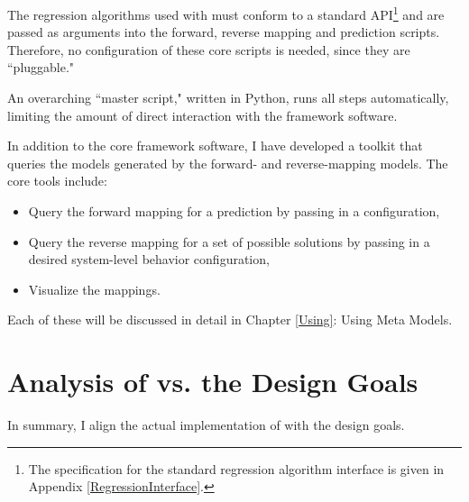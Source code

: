 The regression algorithms used with \fw must conform to a standard API\footnote{The specification for the standard regression algorithm interface is given in Appendix \ref{RegressionInterface}.} and are passed as arguments into the forward, reverse mapping and prediction scripts.
Therefore, no configuration of these core scripts is needed, since they are ``pluggable."

An overarching ``master script," written in Python, runs all steps automatically, limiting the amount of direct interaction with the framework software.

In addition to the core framework software, I have developed a toolkit that queries the models generated by the forward- and reverse-mapping models.
The core tools include:
\begin{itemize}
   \item Query the forward mapping for a prediction by passing in a configuration,
   \item Query the reverse mapping for a set of possible solutions by passing in a desired system-level behavior configuration,
   \item Visualize the mappings.
\end{itemize}
Each of these will be discussed in detail in Chapter \ref{Using}: Using Meta Models.






\section{Analysis of \fw  vs. the Design Goals}
In summary, I align the actual implementation of \fw with the design goals.



